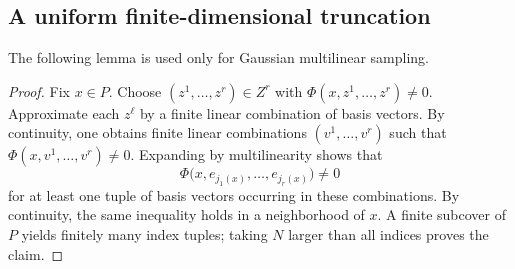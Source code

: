 \documentclass[11pt,oneside]{amsart}
\theoremstyle{plain}
\newtheorem{lemma}[theorem]{Lemma}
\theoremstyle{definition}
\theoremstyle{remark}
\newcommand{\KK}{\mathbb{K}}
\newcommand{\restr}[2]{\left.#1\right|_{#2}}
\begin{document}
\subsection{A uniform finite-dimensional truncation}
The following lemma is used only for Gaussian multilinear sampling.


\begin{proof}
Fix $x\in P$. Choose $(z^1,\ldots,z^r)\in Z^r$ with $\Phi(x,z^1,\ldots,z^r)\neq0$. Approximate each $z^\ell$ by a finite linear combination of basis vectors. By continuity, one obtains finite linear combinations $(v^1,\ldots,v^r)$ such that $\Phi(x,v^1,\ldots,v^r)\neq0$. Expanding by multilinearity shows that
\[
    \Phi\bigl(x,e_{j_1(x)},\ldots,e_{j_r(x)}\bigr)\neq0
\]
for at least one tuple of basis vectors occurring in these combinations. By continuity, the same inequality holds in a neighborhood of $x$. A finite subcover of $P$ yields finitely many index tuples; taking $N$ larger than all indices proves the claim.
\end{proof}
\end{document}
